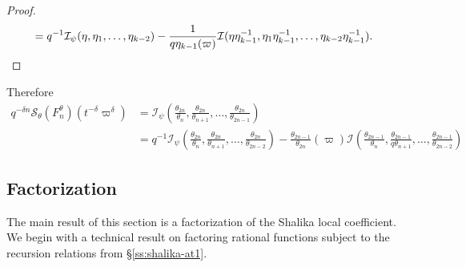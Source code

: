 \documentclass{amsart}
\theoremstyle{definition}
\begin{document}
{\begin{proof}
\begin{align*}
  &=q^{-1}\mathcal{I}_\psi(\eta,\eta_1,\ldots,\eta_{k-2})-\frac{1}{q\eta_{k-1}(\varpi)}\mathcal{I}(\eta\eta_{k-1}^{-1},\eta_1\eta_{k-1}^{-1},\ldots,\eta_{k-2}\eta_{k-1}^{-1}). \qedhere
\end{align*}
\end{proof}
Therefore
\begin{align*}
q^{-\delta n}\mathcal{S}_\theta(F^\theta_n)(t^{-\delta}\varpi^\delta )&=\mathcal{I}_\psi(\frac{\theta_{2n}}{\theta_n},\frac{\theta_{2n}}{\theta_{n+1}},\ldots,\frac{\theta_{2n}}{\theta_{2n-1}})\\
  &=q^{-1}\mathcal{I}_\psi(\frac{\theta_{2n}}{\theta_n},\frac{\theta_{2n}}{\theta_{n+1}},\ldots,\frac{\theta_{2n}}{\theta_{2n-2}})-\frac{\theta_{2n-1}}{\theta_{2n}}(\varpi)\mathcal{I}(\frac{\theta_{2n-1}}{\theta_n},\frac{\theta_{2n-1}}{q\theta_{n+1}},\ldots,\frac{\theta_{2n-1}}{\theta_{2n-2}})
\end{align*}

\subsection{Factorization}
The main result of this section is a factorization of the Shalika local coefficient. We begin with a technical result on factoring rational functions  subject to the recursion relations from \S\ref{ss:shalika-at1}.

}
\end{document}
